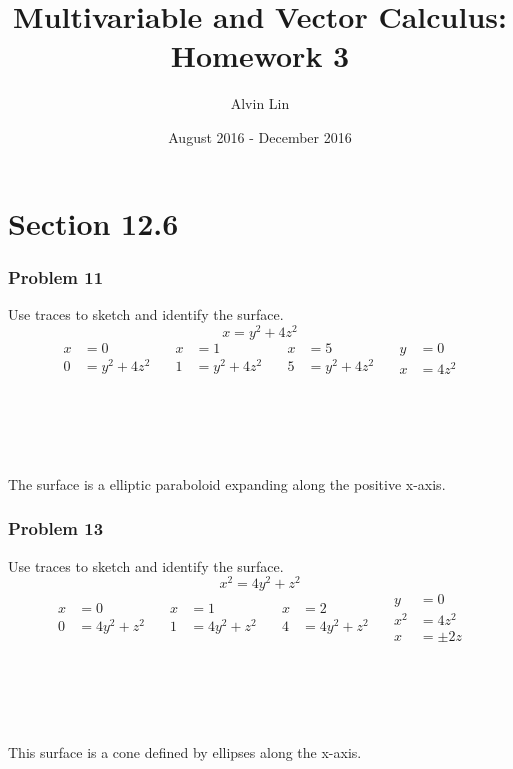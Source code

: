 \documentclass[letterpaper, 12pt]{math}
\title{Multivariable and Vector Calculus: Homework 3}
\author{Alvin Lin}
\date{August 2016 - December 2016}
\begin{document}
\maketitle

\section*{Section 12.6}

\subsubsection*{Problem 11}
Use traces to sketch and identify the surface.
\[ x = y^2+4z^2 \]
\[\begin{split}
  x &= 0 \\
  0 &= y^2+4z^2
\end{split}\quad
\begin{split}
  x &= 1 \\
  1 &= y^2+4z^2
\end{split}\quad
\begin{split}
  x &= 5 \\
  5 &= y^2+4z^2
\end{split}\quad
\begin{split}
  y &= 0 \\
  x &= 4z^2
\end{split} \]
\\ \\ \\ \\ \\
The surface is a elliptic paraboloid expanding along the positive x-axis.

\subsubsection*{Problem 13}
Use traces to sketch and identify the surface.
\[ x^2 = 4y^2+z^2 \]
\[\begin{split}
  x &= 0 \\
  0 &= 4y^2+z^2
\end{split}\quad
\begin{split}
  x &= 1 \\
  1 &= 4y^2+z^2
\end{split}\quad
\begin{split}
  x &= 2 \\
  4 &= 4y^2+z^2
\end{split}\quad
\begin{split}
  y &= 0 \\
  x^2 &= 4z^2 \\
  x &= \pm2z
\end{split} \]
\\ \\ \\ \\ \\
This surface is a cone defined by ellipses along the x-axis.
\end{document}
